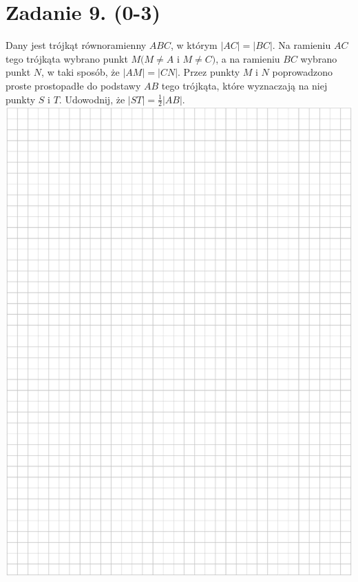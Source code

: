 \documentclass[10pt]{article}
\begin{document}
\section*{Zadanie 9. (0-3)}
Dany jest trójkąt równoramienny \(A B C\), w którym \(|A C|=|B C|\). Na ramieniu \(A C\) tego trójkąta wybrano punkt \(M(M \neq A\) i \(M \neq C)\), a na ramieniu \(B C\) wybrano punkt \(N\), w taki sposób, że \(|A M|=|C N|\). Przez punkty \(M\) i \(N\) poprowadzono proste prostopadłe do podstawy \(A B\) tego trójkąta, które wyznaczają na niej punkty \(S\) i \(T\). Udowodnij, że \(|S T|=\frac{1}{2}|A B|\).\\
\includegraphics[max width=\textwidth, center]{2024_11_21_9df891ea1c7ef9791261g-08}\\
\end{document}
